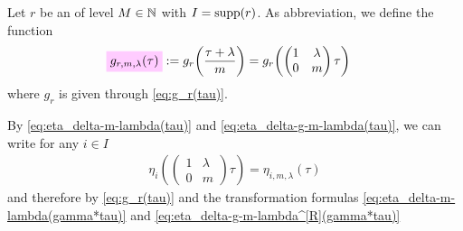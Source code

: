 \documentclass{article}
\begin{document}
Let $r$ be an  of level $M\in\mathbb{N}$ with
$I=\operatorname{supp}(r)$.
%
As abbreviation, we define the function
\begin{align}
  \defineNotation[g-r-m-lambda-tau]{g_{r,m,\lambda}(\tau)}
  &:=
    g_r\!\left(\frac{\tau+\lambda}{m}\right)
    =
  g_r\!\left(
    \begin{pmatrix}1& \lambda\\0&m\end{pmatrix}
    \tau \right)
  \label{eq:g_r-m-lambda(tau)}
\end{align}
where $g_r$ is given through \eqref{eq:g_r(tau)}.

By \eqref{eq:eta_delta-m-lambda(tau)} and
\eqref{eq:eta_delta-g-m-lambda(tau)}, we can write for any $i\in I$
\begin{gather}
  \eta_i\!\left(
    \begin{pmatrix}1& \lambda\\0&m\end{pmatrix}
    \tau \right)
  =
  \eta_{i,m,\lambda}(\tau)
\end{gather}
and therefore by \eqref{eq:g_r(tau)} and the transformation formulas
\eqref{eq:eta_delta-m-lambda(gamma*tau)} and
\eqref{eq:eta_delta-g-m-lambda^[R](gamma*tau)}
\end{document}
